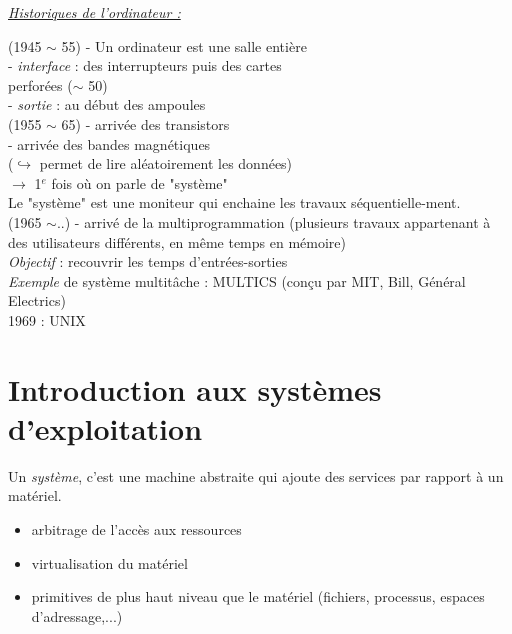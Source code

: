 \documentclass[12pt,a4paper]{report}
\begin{document}
\textit{\underline{Historiques de l'ordinateur :}}

 
(1945 $\sim$ 55) - Un ordinateur est une salle entière\\
\hspace*{2,8 cm} - \textit{interface} : des interrupteurs puis des cartes\\
\hspace*{2,9 cm}perforées ($\sim$ 50)\\
\hspace*{2,8 cm} - \textit{sortie} : au début des ampoules\\

(1955 $\sim$ 65) - arrivée des transistors\\
\hspace*{2,8 cm} - arrivée des bandes magnétiques\\
\hspace*{2,8 cm} ($\hookrightarrow$ permet de lire aléatoirement les données)\\
\hspace*{2,8 cm} $\rightarrow$ 1$^e$ fois où on parle de "système" \\
\hspace*{1cm} Le "système" est une moniteur qui enchaine les travaux séquentielle-ment.\\

(1965 $\sim$..) - arrivé de la multiprogrammation (plusieurs travaux appartenant à des utilisateurs différents, en même temps en mémoire)\\
\textit{Objectif} : recouvrir les temps d'entrées-sorties\\

\textit{Exemple} de système multitâche : MULTICS (conçu par MIT, Bill, Général Electrics)\\
\hspace*{2cm} 1969 : UNIX




\chapter{Introduction aux systèmes d'exploitation}
Un \textit{système}, c'est une machine abstraite qui ajoute des services par rapport à un matériel.
\begin{itemize}
\item arbitrage de l'accès aux ressources
\item virtualisation du matériel
\item primitives de plus haut niveau que le matériel (fichiers, processus, espaces d'adressage,...)
\end{itemize}
\end{document}
